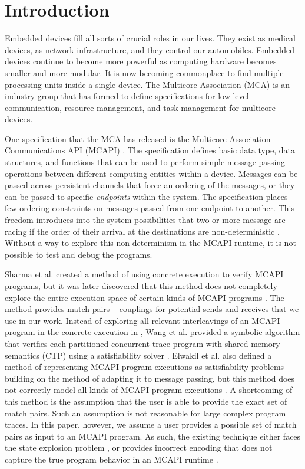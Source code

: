 \section{Introduction}
Embedded devices fill all sorts of crucial roles in our lives. They exist as
medical devices, as network infrastructure, and they control our automobiles.
Embedded devices continue to become more powerful as computing hardware becomes
smaller and more modular. It is now becoming commonplace to find multiple
processing units inside a single device. The Multicore Association (MCA) \cite{mca} is an
industry group that has formed to define specifications for low-level
communication, resource management, and task management for
multicore devices.

One specification that the MCA has released is the Multicore Association
Communications API (MCAPI) \cite{mcapi}. The specification defines basic data type, data
structures, and functions that can be used to perform simple message passing
operations between different computing entities within a device. Messages can be
passed across persistent channels that force an ordering of the messages, or
they can be passed to specific \emph{endpoints} within the system. The specification places few ordering constraints on messages passed from one
endpoint to another. This freedom introduces into the system possibilities that two or more message are racing if the order of their arrival at the destinations are non-deterministic \cite{netzer:spdt96}. Without a way to explore this non-determinism in the MCAPI runtime, it is not possible to test and debug the programs.

Sharma et al. created a method of using concrete execution to verify MCAPI
programs, but it was later discovered that this method does not completely
explore the entire execution space of certain kinds of MCAPI programs \cite{sharma:fmcad09}. The method provides match pairs -- couplings for potential sends and receives that we use in our work. Instead of exploring all relevant interleavings of an MCAPI program in the concrete execution in \cite{sharma:fmcad09}, Wang et al. provided a symbolic algorithm that verifies each partitioned concurrent trace program with shared memory semantics (CTP) using a satisfiability solver \cite{wang:fse09}. Elwakil et al. also defined a method of representing MCAPI program executions as satisfiability problems building on the method of \cite{wang:fse09} adapting it to message passing, but this method does not correctly model all kinds of MCAPI program executions \cite{elwakil:padtad10}. A shortcoming of this method is the assumption that the user is able to provide the exact set of match pairs. Such an assumption is not reasonable for large complex program traces. In this paper, however, we assume a user provides a possible set of match pairs as input to an MCAPI program. As such, the existing technique either faces the state explosion problem \cite{sharma:fmcad09}, or provides incorrect encoding that does not capture the true program behavior in an MCAPI runtime \cite{elwakil:padtad10}.

